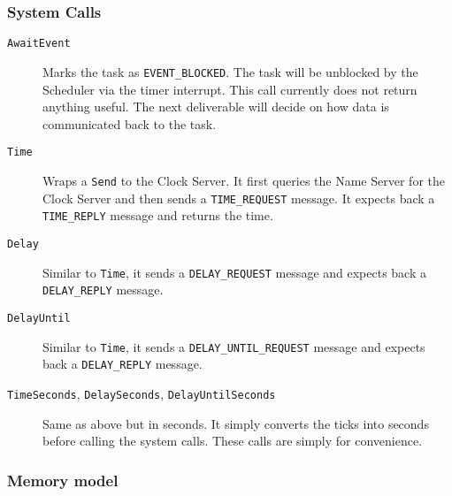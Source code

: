 \documentclass[letterpaper]{article}
\begin{document}
\subsubsection{System Calls%
  \label{system-calls}%
}
%
\begin{description}
\item[{\texttt{AwaitEvent}}] \leavevmode 
Marks the task as \texttt{EVENT\_BLOCKED}. The task will be unblocked by the Scheduler via the timer interrupt. This call currently does not return anything useful. The next deliverable will decide on how data is communicated back to the task.

\item[{\texttt{Time}}] \leavevmode 
Wraps a \texttt{Send} to the Clock Server. It first queries the Name Server for the Clock Server and then sends a \texttt{TIME\_REQUEST} message. It expects back a \texttt{TIME\_REPLY} message and returns the time.

\item[{\texttt{Delay}}] \leavevmode 
Similar to \texttt{Time}, it sends a \texttt{DELAY\_REQUEST} message and expects back a \texttt{DELAY\_REPLY} message.

\item[{\texttt{DelayUntil}}] \leavevmode 
Similar to \texttt{Time}, it sends a \texttt{DELAY\_UNTIL\_REQUEST} message and expects back a \texttt{DELAY\_REPLY} message.

\item[{\texttt{TimeSeconds}, \texttt{DelaySeconds}, \texttt{DelayUntilSeconds}}] \leavevmode 
Same as above but in seconds. It simply converts the ticks into seconds before calling the system calls. These calls are simply for convenience.

\end{description}


\subsubsection{Memory model%
  \label{memory-model}%
}
\end{document}
